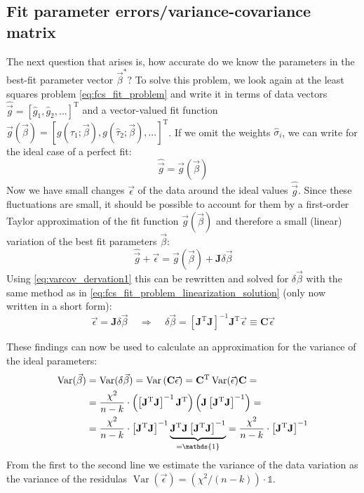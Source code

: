 \documentclass[a4paper,notitlepage]{article}
\DeclareMathOperator{\Var}{Var}
\newcommand{\mat}[1]{\mathrm{\mathbf{#1}}}
\begin{document}
\subsection{Fit parameter errors/variance-covariance matrix}
\label{sec:varcovmatrix}
The next question that arises is, how accurate do we know the parameters in the best-fit parameter vector $\vec{\beta}^\ast$? 
To solve this problem, we look again at the least squares problem \eqref{eq:fcs_fit_problem} and write it in terms of data vectors $\hat{\vec{g}}=[\hat{g}_1,\hat{g}_2,...]^\mathrm{T}$ and a vector-valued fit function $\vec{g}(\vec{\beta})=[g(\hat{\tau}_1;\vec{\beta}), g(\hat{\tau}_2;\vec{\beta}),...]^\mathrm{T}$. If we omit the weights $\hat{\sigma}_i$, we can write for the ideal case of a perfect fit:
\begin{equation}\label{eq:varcov_dervation1}
   \hat{\vec{g}}=\vec{g}(\vec{\beta}) 
\end{equation}
Now we have small changes $\vec{\epsilon}$ of the data around the ideal values $\hat{\vec{g}}$. Since these fluctuations are small, it should be possible to account for them by a first-order Taylor approximation of the fit function $\vec{g}(\vec{\beta})$ and therefore a small (linear) variation of the best fit parameters $\vec{\beta}$:
\begin{equation}\label{eq:varcov_dervation2}
   \hat{\vec{g}}+\vec{\epsilon}=\vec{g}(\vec{\beta})+\mat{J}\delta\vec{\beta} 
\end{equation}
Using \eqref{eq:varcov_dervation1} this can be rewritten and solved for $\delta\vec{\beta}$ with the same method as in \eqref{eq:fcs_fit_problem_linearization_solution} (only now written in a short form):
\begin{equation}\label{eq:varcov_dervation3}
   \vec{\epsilon}=\mat{J}\delta\vec{\beta} \ \ \ \ \ \Rightarrow\ \ \ \ \ \delta\vec{\beta}=\left[\mat{J}^\mathrm{T}\mat{J}\right]^{-1}\mat{J}^\mathrm{T}\vec{\epsilon}\equiv \mat{C}\vec{\epsilon}
\end{equation}

  
These findings can now be used to calculate an approximation for the variance of the ideal parameters:
\begin{align}\label{eq:varcov_dervation4}
    \Var(\vec{\beta})&=\Var(\delta\vec{\beta})=\Var\left(\mat{C}\vec{\epsilon}\right)=\mat{C}^\mathrm{T}\Var(\vec{\epsilon})\mat{C}=\notag\\
    &=\frac{\chi^2}{n-k}\cdot\left(\left[\mat{J}^\mathrm{T}\mat{J}\right]^{-1}\mat{J}^\mathrm{T}\right)\left(\mat{J}\left[\mat{J}^\mathrm{T}\mat{J}\right]^{-1}\right)=\notag\\
    &=\frac{\chi^2}{n-k}\cdot\left[\mat{J}^\mathrm{T}\mat{J}\right]^{-1}\underbrace{\mat{J}^\mathrm{T}\mat{J}\left[\mat{J}^\mathrm{T}\mat{J}\right]^{-1}}_{=\mathds{1}}=\frac{\chi^2}{n-k}\cdot\left[\mat{J}^\mathrm{T}\mat{J}\right]^{-1}
\end{align}
From the first to the second line we estimate the variance of the data variation as the variance of the residulas $\Var(\vec{\epsilon})=(\chi^2/(n-k))\cdot \mathds{1}$. 
\end{document}
